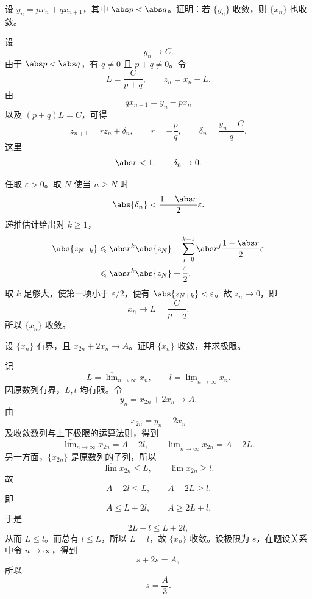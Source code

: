 \begin{xreferenceproblem}[第二组参考题 7]
设 $y_n=px_n+qx_{n+1}$，其中 $\abs p<\abs q$。证明：若 $\{y_n\}$ 收敛，则 $\{x_n\}$ 也收敛。
\end{xreferenceproblem}
\begin{xsolution}
设
\[
  y_n\to C.
\]
由于 $\abs p<\abs q$，有 $q\neq0$ 且 $p+q\neq0$。令
\[
  L=\frac{C}{p+q},
  \qquad z_n=x_n-L.
\]
由
\[
  qx_{n+1}=y_n-px_n
\]
以及 $(p+q)L=C$，可得
\[
  z_{n+1}=r z_n+\delta_n,
  \qquad
  r=-\frac pq,
  \qquad
  \delta_n=\frac{y_n-C}{q}.
\]
这里
\[
  \abs r<1,
  \qquad \delta_n\to0.
\]

任取 $\varepsilon>0$。取 $N$ 使当 $n\geqslant N$ 时
\[
  \abs{\delta_n}<\frac{1-\abs r}{2}\varepsilon.
\]
递推估计给出对 $k\geqslant1$，
\begin{align*}
  \abs{z_{N+k}}
  &\leqslant \abs r^k\abs{z_N}
  +\sum_{j=0}^{k-1}\abs r^j
  \frac{1-\abs r}{2}\varepsilon\\
  &\leqslant \abs r^k\abs{z_N}+\frac\varepsilon2.
\end{align*}
取 $k$ 足够大，使第一项小于 $\varepsilon/2$，便有 $\abs{z_{N+k}}<\varepsilon$。故 $z_n\to0$，即
\[
  x_n\to L=\frac{C}{p+q}.
\]
所以 $\{x_n\}$ 收敛。
\end{xsolution}

\begin{xreferenceproblem}[第二组参考题 8]
设 $\{x_n\}$ 有界，且 $x_{2n}+2x_n\to A$。证明 $\{x_n\}$ 收敛，并求极限。
\end{xreferenceproblem}
\begin{xsolution}
记
\[
  L=\overline{\lim}_{n\to\infty}x_n,
  \qquad
  l=\underline{\lim}_{n\to\infty}x_n.
\]
因原数列有界，$L,l$ 均有限。令
\[
  y_n=x_{2n}+2x_n\to A.
\]
由
\[
  x_{2n}=y_n-2x_n
\]
及收敛数列与上下极限的运算法则，得到
\[
  \overline{\lim}_{n\to\infty}x_{2n}=A-2l,
  \qquad
  \underline{\lim}_{n\to\infty}x_{2n}=A-2L.
\]
另一方面，$\{x_{2n}\}$ 是原数列的子列，所以
\[
  \overline{\lim}x_{2n}\leqslant L,
  \qquad
  \underline{\lim}x_{2n}\geqslant l.
\]
故
\[
  A-2l\leqslant L,
  \qquad
  A-2L\geqslant l.
\]
即
\[
  A\leqslant L+2l,
  \qquad
  A\geqslant2L+l.
\]
于是
\[
  2L+l\leqslant L+2l,
\]
从而 $L\leqslant l$。而总有 $l\leqslant L$，所以 $L=l$，故 $\{x_n\}$ 收敛。设极限为 $s$，在题设关系中令 $n\to\infty$，得到
\[
  s+2s=A,
\]
所以
\[
  \boxed{s=\frac A3}.
\]
\end{xsolution}

